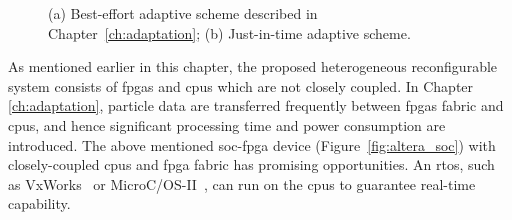 \setcounter{subfigure}{0}
\begin{figure}[t!]
\centering
{}
\caption{(a) Best-effort adaptive scheme described in Chapter~\ref{ch:adaptation}; (b) Just-in-time adaptive scheme.}
\end{figure}

As mentioned earlier in this chapter, the proposed heterogeneous reconfigurable system consists of \glspl{fpga} and \glspl{cpu} which are not closely coupled.
In Chapter \ref{ch:adaptation}, particle data are transferred frequently between \glspl{fpga} fabric and \glspl{cpu}, and hence significant processing time and power consumption are introduced.
The above mentioned \gls{soc}-\gls{fpga} device (Figure~\ref{fig:altera_soc}) with closely-coupled \glspl{cpu} and \gls{fpga} fabric has promising opportunities.
An \gls{rtos}, such as VxWorks~\cite{vxworks} or MicroC/OS-II~\cite{microcos}, can run on the \glspl{cpu} to guarantee real-time capability.


